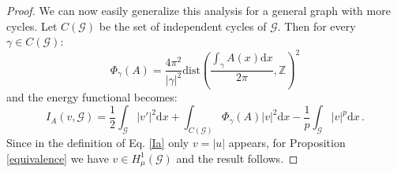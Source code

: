 \documentclass[10pt,a4paper]{amsart}
\begin{document}
\begin{proof}
\medskip

We can now easily generalize this analysis for a general graph with more cycles. 
Let $C(\mathcal{G})$ be the set of independent cycles of $\mathcal{G}$. Then for every $\gamma \in C(\mathcal{G})$:
\begin{equation}
    \Phi_{\gamma}(A) = \frac{4 \pi^2}{|\gamma|^2} \mathrm{dist}\left( \frac{\int_\gamma A(x) \mathrm{d}x}{2 \pi}, \mathbb{Z} \right)^2
\end{equation}
and the energy functional becomes:
\begin{equation} \label{Ia2}
     I_A(v,\mathcal{G})  = \frac{1}{2}\int_{\mathcal{G}} |v'|^2 \mathrm{d}x + \int_{C(\mathcal{G})}\Phi_{\gamma}(A) |v|^2 \mathrm{d}x - \frac{1}{p} \int_{\mathcal{G}} |v|^p \mathrm{d}x\,.
\end{equation}
Since in the definition of Eq. \eqref{Ia} only $v = |u|$ appears, for Proposition \ref{equivalence} we have $v \in H^1_{\mu}(\mathcal{G})$ and the result follows.
\end{proof}
\end{document}
